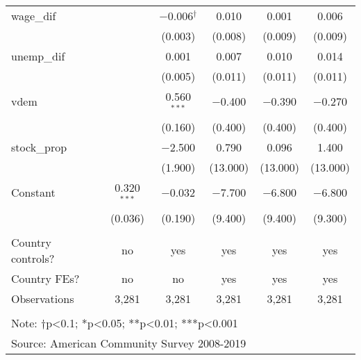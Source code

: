 \documentclass[
  11pt,
]{article}
\begin{document}
\begin{table}[!htbp]
\begin{tabular}{@{\extracolsep{5pt}}lccccc}
  wage\_dif &  & $-$0.006$^{†}$ & 0.010 & 0.001 & 0.006 \\ 
  &  & (0.003) & (0.008) & (0.009) & (0.009) \\ 
  unemp\_dif &  & 0.001 & 0.007 & 0.010 & 0.014 \\ 
  &  & (0.005) & (0.011) & (0.011) & (0.011) \\ 
  vdem &  & 0.560$^{***}$ & $-$0.400 & $-$0.390 & $-$0.270 \\ 
  &  & (0.160) & (0.400) & (0.400) & (0.400) \\ 
  stock\_prop &  & $-$2.500 & 0.790 & 0.096 & 1.400 \\ 
  &  & (1.900) & (13.000) & (13.000) & (13.000) \\ 
  Constant & 0.320$^{***}$ & $-$0.032 & $-$7.700 & $-$6.800 & $-$6.800 \\ 
  & (0.036) & (0.190) & (9.400) & (9.400) & (9.300) \\ 
 \hline \\[-1.8ex] 
Country controls? & no & yes & yes & yes & yes \\ 
Country FEs? & no & no & yes & yes & yes \\ 
Observations & 3,281 & 3,281 & 3,281 & 3,281 & 3,281 \\ 
\hline 
\hline \\[-1.8ex] 
\multicolumn{6}{l}{Note: †p<0.1; *p<0.05; **p<0.01; ***p<0.001} \\ 
\multicolumn{6}{l}{Source: American Community Survey 2008-2019} \\ 
\end{tabular} 
\end{table}
\end{document}
